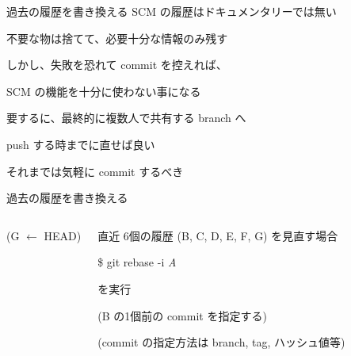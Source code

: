 \begin{frame}[t]{過去の履歴を書き換える}{}
  SCM の履歴はドキュメンタリーでは無い

  不要な物は捨てて、必要十分な情報のみ残す
  \vspace{2ex}

  しかし、失敗を恐れて commit を控えれば、

  SCM の機能を十分に使わない事になる
  \vspace{4ex}

  要するに、最終的に複数人で共有する branch へ

  push する時までに直せば良い

  それまでは気軽に commit するべき

\end{frame}


\begin{frame}[t]{過去の履歴を書き換える}{}

  \begin{columns}

    \begin{narrowcolumn}

      \begin{center}

        {\footnotesize{(G \alert{$\leftarrow$ HEAD})}}
      \end{center}

    \end{narrowcolumn}

    \begin{widecolumn}

      直近 6個の履歴 (B, C, D, E, F, G) を見直す場合
      \vspace{2ex}

      \$ git rebase -i \textit{A}
      \vspace{2ex}

      を実行
      \vspace{2ex}

      (B の1個前の commit を指定する)

      (commit の指定方法は branch, tag, ハッシュ値等)
    \end{widecolumn}

  \end{columns}

\end{frame}



